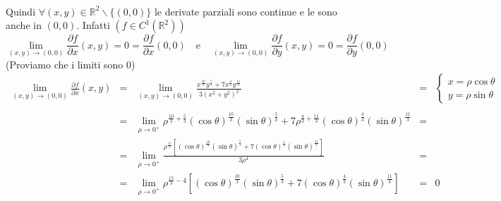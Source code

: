 \begin{example}
\begin{enumerate}
\begin{enumerate}
\begin{equation*}
\begin{matrix}
			\end{matrix}
		\end{equation*}
		Quindi $\forall (x,y)\in\mathbb{R}^2\backslash\{(0,0)\}$ le derivate parziali sono continue e le sono anche in $(0,0)$. Infatti $\left(f\in C^1(\mathbb{R}^2)\right)$
		\begin{equation*}
			\lim_{(x,y)\rightarrow(0,0)}\frac{\partial f}{\partial x}(x,y)=0=\frac{\partial f}{\partial x}(0,0)\quad\text{e}\quad\lim_{(x,y)\rightarrow(0,0)}\frac{\partial f}{\partial y}(x,y)=0=\frac{\partial f}{\partial y}(0,0)
		\end{equation*}
		(Proviamo che i limiti sono 0)
		\begin{equation*}
			\begin{matrix}
				\lim\limits_{(x,y)\rightarrow(0,0)}\frac{\partial f}{\partial x} (x,y) &=& \lim\limits_{(x,y) \rightarrow(0,0)}\frac{x^{\frac{10}{3}}y^{\frac{5}{3}}+7x^{\frac{4}{3}}y^{\frac{11}{3}}}{3(x^2+y^2)^2} &=&
				\begin{cases}
					x = \rho\cos\theta\\
					y = \rho\sin\theta
				\end{cases}\\\\
				&=&\lim\limits_{\rho\rightarrow0^+}\rho^{\frac{10}{3}+\frac{5}{3}}(\cos\theta)^{\frac{10}{3}}(\sin\theta)^{\frac{5}{3}}+7\rho^{\frac{4}{3}+\frac{11}{3}}(\cos\theta)^{\frac{4}{3}}(\sin\theta)^{\frac{11}{3}} &=&
				\\
				&=&\lim\limits_{\rho\rightarrow 0^+}\frac{\rho^{\frac{15}{3}}\left[(\cos\theta)^{\frac{10}{3}}(\sin\theta)^{\frac{5}{3}}+7(\cos\theta)^{\frac{4}{3}}(\sin\theta)^{\frac{11}{3}} \right]}{3\rho^4}&=&\\
				&=&\lim\limits_{\rho\rightarrow 0^+}\rho^{\frac{15}{3}-4}\left[(\cos\theta)^{\frac{10}{3}}(\sin\theta)^{\frac{5}{3}}+7(\cos\theta)^{\frac{4}{3}}(\sin\theta)^{\frac{11}{3}} \right] &=&0
			\end{matrix}
		\end{equation*}

\end{enumerate}
\end{enumerate}
\end{example}
